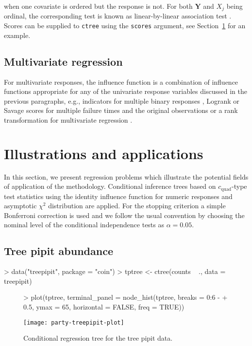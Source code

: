 \documentclass{Z}
\newcommand{\Y}{\mathbf{Y}}
\begin{document}
when one covariate is ordered but the response is not. For both $\Y$ and $X_j$
being ordinal, the corresponding test is known as linear-by-linear association
test \citep{Agresti2002}. Scores can be supplied to \texttt{ctree} using the
\texttt{scores} argument, see Section~\ref{illustrations} for an example.

\subsection{Multivariate regression}

For multivariate responses, the influence function is a combination of
influence functions appropriate for any of the univariate response variables
discussed in the previous paragraphs, e.g., indicators for multiple binary
responses \citep{Zhang1998,NohSongPark2004}, Logrank or Savage scores
for multiple failure times 
and the original observations or a rank transformation for multivariate regression 
\citep{Death2002}.

\section{Illustrations and applications} \label{illustrations}

In this section, we present regression problems which illustrate the
potential fields of application of the methodology.  
Conditional inference trees based on $c_\text{quad}$-type test statistics 
using the identity influence function for numeric responses 
and asymptotic $\chi^2$ distribution are applied.
For the stopping criterion a simple
Bonferroni correction is used and we follow the usual convention by choosing
the nominal level of the conditional independence tests as $\alpha = 0.05$.

\subsection{Tree pipit abundance}

\begin{Schunk}
\begin{Sinput}
> data("treepipit", package = "coin")
> tptree <- ctree(counts ~ ., data = treepipit)
\end{Sinput}
\end{Schunk}

\begin{figure}[t]
\begin{center}
\begin{Schunk}
\begin{Sinput}
> plot(tptree, terminal_panel = node_hist(tptree, breaks = 0:6 - 
+     0.5, ymax = 65, horizontal = FALSE, freq = TRUE))
\end{Sinput}
\end{Schunk}
\texttt{[image: party-treepipit-plot]}
\caption{Conditional regression tree for the tree pipit data.}
\end{center}
\end{figure}
\end{document}
